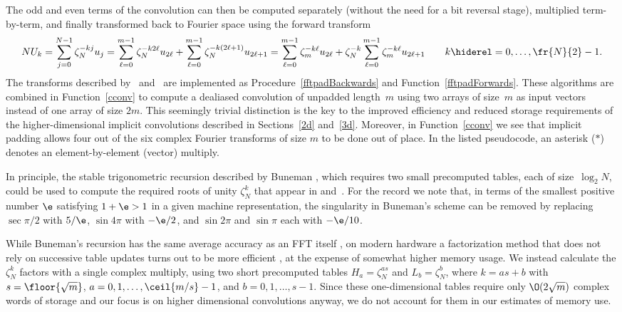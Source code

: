 \documentclass[final]{siamltex}
\def\bel{\begin{dmath}}
\def\eel{\end{dmath}}
\def\no{\hiderel}
\begin{document}
The odd and even terms of the convolution can then be computed separately
(without the need for a bit reversal stage), multiplied term-by-term, and
finally transformed back to Fourier space using the forward transform
\bel
NU_k=\sum_{j=0}^{N-1}\zeta_N^{-kj} u_j
=\sum_{\ell=0}^{m-1}\zeta_N^{-k2\ell} u_{2\ell}
+\sum_{\ell=0}^{m-1}\zeta_N^{-k(2\ell+1)} u_{2\ell+1}
=\sum_{\ell=0}^{m-1}\zeta_m^{-k\ell} u_{2\ell}
+\zeta_N^{-k}\sum_{\ell=0}^{m-1}\zeta_m^{-k\ell} u_{2\ell+1}
\qquad k\no=0,\ldots,\fr{N}{2}-1.\label{cconv1forwards}
\eel
The transforms described by~ and~
are implemented as Procedure~\ref{fftpadBackwards} and
Function~\ref{fftpadForwards}.
These algorithms are combined in Function~\ref{cconv} to 
compute a dealiased convolution of unpadded length~$m$ using
two arrays of size~$m$ as input vectors instead of one array of size $2m$.
This seemingly trivial distinction is the key to the improved efficiency
and reduced storage requirements of the higher-dimensional implicit
convolutions described in Sections~\ref{2d} and~\ref{3d}.
Moreover, in Function~\ref{cconv} we see that implicit padding allows four
out of the six complex Fourier transforms of size $m$ to be done out of place.
In the listed pseudocode, an asterisk ($*$) denotes an element-by-element
(vector) multiply.

In principle, the stable trigonometric recursion described by
Buneman \cite{Buneman87}, which requires two small precomputed tables, each
of size~$\log_2 N$, could be used to compute the required roots of unity
$\zeta_N^k$ that appear in 
and~. For the
record we note that, in terms of the smallest positive number $\e$ 
satisfying $1+\e > 1$ in a given machine representation, the singularity in
Buneman's scheme can be removed by replacing $\sec{\pi/2}$ with  $5/\e$,
$\sin 4\pi$ with $-\e/2$, and $\sin{2\pi}$ and $\sin{\pi}$ each with $-\e/10$.

While Buneman's recursion has the same average accuracy as an FFT
itself \cite{Tasche02}, on modern hardware a factorization method that does
not rely on successive table updates turns out to be more
efficient \cite{Johnson09}, at the expense of somewhat higher memory usage.
We instead calculate the $\zeta_N^k$ factors with a single complex
multiply, using two short precomputed tables $H_a=\zeta_N^{as}$ and
$L_b=\zeta_N^b$, where $k=as+b$ with $s=\floor{\sqrt m}$,
$a=0,1,\ldots,\ceil{m/s}-1$, and $b=0,1,\ldots,s-1$. Since these
one-dimensional tables require only $\O(2\sqrt{m})$ complex words of
storage and our focus is on higher dimensional convolutions anyway, we do
not account for them in our estimates of memory use. 
\end{document}
